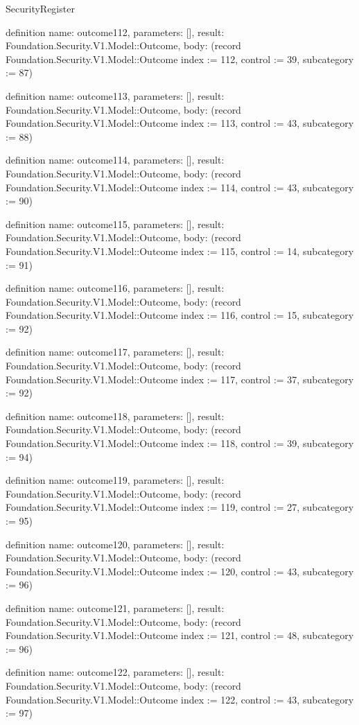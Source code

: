 \begin{lexlean}{SecurityRegister}
\begin{semanticmodule}
definition{
  name: outcome112,
  parameters: [],
  result: Foundation.Security.V1.Model::Outcome,
  body: (record Foundation.Security.V1.Model::Outcome {index := 112, control := 39, subcategory := 87})
}

definition{
  name: outcome113,
  parameters: [],
  result: Foundation.Security.V1.Model::Outcome,
  body: (record Foundation.Security.V1.Model::Outcome {index := 113, control := 43, subcategory := 88})
}

definition{
  name: outcome114,
  parameters: [],
  result: Foundation.Security.V1.Model::Outcome,
  body: (record Foundation.Security.V1.Model::Outcome {index := 114, control := 43, subcategory := 90})
}

definition{
  name: outcome115,
  parameters: [],
  result: Foundation.Security.V1.Model::Outcome,
  body: (record Foundation.Security.V1.Model::Outcome {index := 115, control := 14, subcategory := 91})
}

definition{
  name: outcome116,
  parameters: [],
  result: Foundation.Security.V1.Model::Outcome,
  body: (record Foundation.Security.V1.Model::Outcome {index := 116, control := 15, subcategory := 92})
}

definition{
  name: outcome117,
  parameters: [],
  result: Foundation.Security.V1.Model::Outcome,
  body: (record Foundation.Security.V1.Model::Outcome {index := 117, control := 37, subcategory := 92})
}

definition{
  name: outcome118,
  parameters: [],
  result: Foundation.Security.V1.Model::Outcome,
  body: (record Foundation.Security.V1.Model::Outcome {index := 118, control := 39, subcategory := 94})
}

definition{
  name: outcome119,
  parameters: [],
  result: Foundation.Security.V1.Model::Outcome,
  body: (record Foundation.Security.V1.Model::Outcome {index := 119, control := 27, subcategory := 95})
}

definition{
  name: outcome120,
  parameters: [],
  result: Foundation.Security.V1.Model::Outcome,
  body: (record Foundation.Security.V1.Model::Outcome {index := 120, control := 43, subcategory := 96})
}

definition{
  name: outcome121,
  parameters: [],
  result: Foundation.Security.V1.Model::Outcome,
  body: (record Foundation.Security.V1.Model::Outcome {index := 121, control := 48, subcategory := 96})
}

definition{
  name: outcome122,
  parameters: [],
  result: Foundation.Security.V1.Model::Outcome,
  body: (record Foundation.Security.V1.Model::Outcome {index := 122, control := 43, subcategory := 97})
}


\end{semanticmodule}
\end{lexlean}
